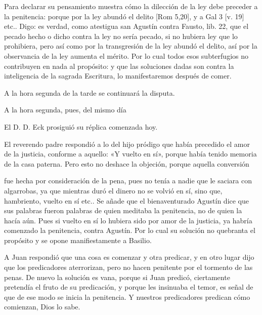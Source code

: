 Para declarar su pensamiento muestra cómo la dilección de la ley debe preceder a la penitencia: porque por la ley abundó el delito [Rom 5,20], y a Gal 3 [v. 19] etc.. Digo: es verdad, como atestigua san Agustín contra Fausto, lib. 22, que el pecado hecho o dicho contra la ley no sería pecado, si no hubiera ley que lo prohibiera, pero así como por la transgresión de la ley abundó el delito, así por la observancia de la ley aumenta el mérito. Por lo cual todos esos subterfugios no contribuyen en nada al propósito: y que las soluciones dadas son contra la inteligencia de la sagrada Escritura, lo manifestaremos después de comer.

A la hora segunda de la tarde se continuará la disputa.

A la hora segunda, pues, del mismo día

El D. D. Eck prosiguió su réplica comenzada hoy.

El reverendo padre respondió a lo del hijo pródigo que había precedido el amor de la justicia, conforme a aquello: «Y vuelto en sí», porque había tenido memoria de la casa paterna. Pero esto no deshace la objeción, porque aquella conversión

fue hecha por consideración de la pena, pues no tenía a nadie que le saciara con algarrobas, ya que mientras duró el dinero no se volvió en sí, sino que, hambriento, vuelto en sí etc.. Se añade que el bienaventurado Agustín dice que sus palabras fueron palabras de quien meditaba la penitencia, no de quien la hacía aún. Pues si vuelto en sí lo hubiera sido por amor de la justicia, ya habría comenzado la penitencia, contra Agustín. Por lo cual su solución no quebranta el propósito y se opone manifiestamente a Basilio.

A Juan respondió que una cosa es comenzar y otra predicar, y en otro lugar dijo que los predicadores aterrorizan, pero no hacen penitente por el tormento de las penas. De nuevo la solución es vana, porque si Juan predicó, ciertamente pretendía el fruto de su predicación, y porque les insinuaba el temor, es señal de que de ese modo se inicia la penitencia. Y nuestros predicadores predican cómo comienzan, Dios lo sabe.

